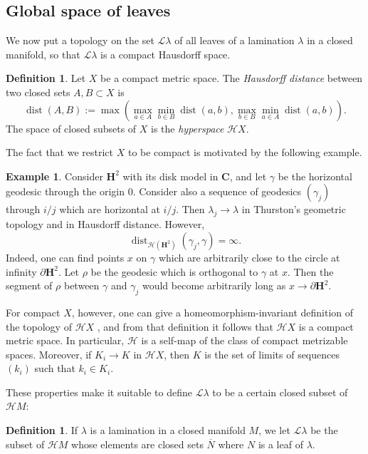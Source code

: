 \documentclass[reqno,10pt]{amsart}
\newcommand{\CC}{\mathbf{C}}
\newcommand{\Hyp}{\mathbf H}
\DeclareMathOperator{\dist}{dist}
\newcommand{\Leaves}{\mathscr L}
\newcommand{\Hypspace}{\mathscr H}
\newcommand{\dfn}[1]{\emph{#1}\index{#1}}
\theoremstyle{definition}
\newtheorem{definition}[theorem]{Definition}
\newtheorem{example}[theorem]{Example}
\numberwithin{equation}{section}
\begin{document}
\subsection{Global space of leaves}
We now put a topology on the set $\Leaves \lambda$ of all leaves of a lamination $\lambda$ in a closed manifold, so that $\Leaves \lambda$ is a compact Hausdorff space.

\begin{definition}
Let $X$ be a compact metric space. The \dfn{Hausdorff distance} between two closed sets $A, B \subset X$ is
$$\dist(A, B) := \max\left(\max_{a \in A} \min_{b \in B} \dist(a, b), \max_{b \in B} \min_{a \in A} \dist(a, b)\right).$$
The space of closed subsets of $X$ is the \dfn{hyperspace} $\Hypspace X$.
\end{definition}

The fact that we restrict $X$ to be compact is motivated by the following example.

\begin{example}
Consider $\Hyp^2$ with its disk model in $\CC$, and let $\gamma$ be the horizontal geodesic through the origin $0$.
Consider also a sequence of geodesics $(\gamma_j)$ through $i/j$ which are horizontal at $i/j$.
Then $\lambda_j \to \lambda$ in Thurston's geometric topology and in Hausdorff distance.
However,
$$\dist_{\mathscr H(\Hyp^2)}(\gamma_j, \gamma) = \infty.$$
Indeed, one can find points $x$ on $\gamma$ which are arbitrarily close to the circle at infinity $\partial \Hyp^2$.
Let $\rho$ be the geodesic which is orthogonal to $\gamma$ at $x$.
Then the segment of $\rho$ between $\gamma$ and $\gamma_j$ would become arbitrarily long as $x \to \partial \Hyp^2$.
\end{example}

For compact $X$, however, one can give a homeomorphism-invariant definition of the topology of $\Hypspace X$ \cite[Chapter 4]{nadler2017continuum}, and from that definition it follows that $\Hypspace X$ is a compact metric space.
In particular, $\Hypspace$ is a self-map of the class of compact metrizable spaces.
Moreover, if $K_i \to K$ in $\Hypspace X$, then $K$ is the set of limits of sequences $(k_i)$ such that $k_i \in K_i$.

These properties make it suitable to define $\Leaves \lambda$ to be a certain closed subset of $\Hypspace M$:

\begin{definition}
If $\lambda$ is a lamination in a closed manifold $M$, we let $\Leaves \lambda$ be the subset of $\Hypspace M$ whose elements are closed sets $\overline N$ where $N$ is a leaf of $\lambda$.
\end{definition}
\end{document}
